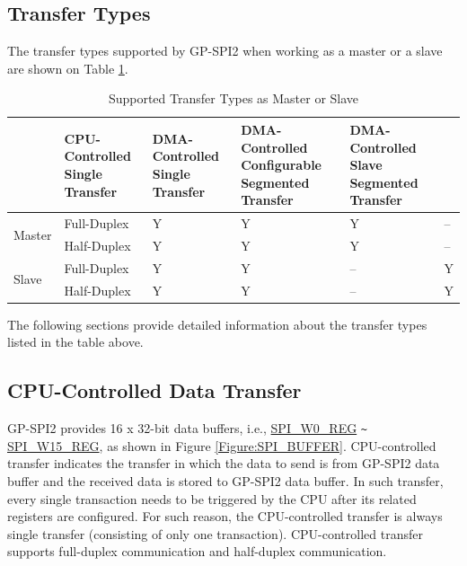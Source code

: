 \documentclass[main\_\_EN.tex]{subfiles}
\begin{document}
\subsection{Transfer Types}

The transfer types supported by GP-SPI2 when working as a master or a slave are shown on Table \ref{tab:transfer-modes}.

\begin{table}[H]
    \centering
    \caption{Supported Transfer Types as Master or Slave}
    \label{tab:transfer-modes}
    \begin{threeparttable}
    \begin{tabular}{|l|l|p{2.5cm}<{\centering}|p{2.5cm}<{\centering}|p{3.3cm}<{\centering}|p{3.3cm}<{\centering}| }
    \hline
        \rowcolor{lightgray}
        \multicolumn{2}{l|}{\textbf{Mode}}  & \textbf{CPU-Controlled Single Transfer}  & \textbf{DMA-Controlled Single Transfer} &   \textbf{DMA-Controlled Configurable Segmented Transfer}    & \textbf{DMA-Controlled Slave Segmented Transfer} \\\hline
    \multirow{2}{*}{Master} & Full-Duplex & Y & Y & Y & --\\\cline{2-6}
    
    & Half-Duplex & Y & Y & Y & --\\\hline
    
    \multirow{2}{*}{Slave} & Full-Duplex & Y & Y & -- &Y \\\cline{2-6}
    & Half-Duplex & Y & Y & -- &Y \\\hline
        \end{tabular}
     \end{threeparttable}
    \end{table}

The following sections provide detailed information about the transfer types listed in the table above.

\subsection{CPU-Controlled Data Transfer}\label{sec:cpu-controlled-data-transfer}
GP-SPI2 provides 16 x 32-bit data buffers, i.e., \hyperref[regdesc:SPIW0REG]{SPI\_W0\_REG} \verb+~+ \hyperref[regdesc:SPIW0REG]{SPI\_W15\_REG}, as shown in Figure \ref{Figure:SPI_BUFFER}. 
CPU-controlled transfer indicates the transfer in which the data to send is from GP-SPI2 data buffer and the received data is stored to GP-SPI2 data buffer. 
In such transfer, every single transaction needs to be triggered by the CPU after its related registers are configured. For such reason, the CPU-controlled transfer is always single transfer (consisting of only one transaction). CPU-controlled transfer supports full-duplex communication and half-duplex communication.
\end{document}
